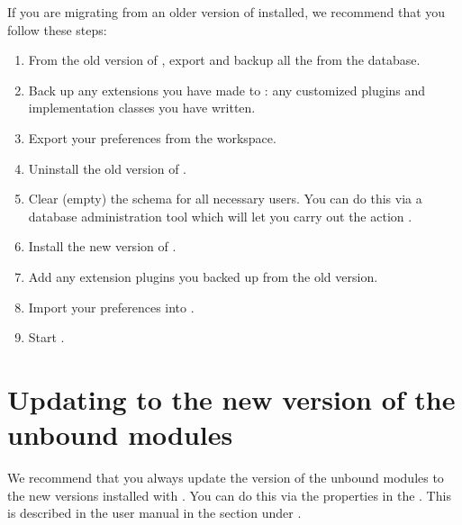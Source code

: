 If you are migrating from an older version of \app{} installed, we recommend that you follow these steps:

\begin{enumerate}
\item From the old version of \app{}, export and backup all the \gdprojects{} from the database. 
\item Back up any extensions you have made to \app{}: any customized plugins and implementation classes you have written.  
\item Export your \gddb{} preferences from the workspace.
\item Uninstall the old version of \app{}. 
\item Clear (empty) the \gddb{} schema for all necessary \app{} users. You can do this via a database administration tool which will let you carry out the action . 
\item Install the new version of \app{}.
\item Add any extension plugins you backed up from the old version.
\item Import your \gddb{} preferences into \app{}.
\item Start \app{}.  

\end{enumerate}

\section{Updating to the new version of the unbound modules}
We recommend that you always update the version of the unbound modules \gdprojects{} to the new versions installed with \app{}. You can do this via the \gdproject{} properties in the \ite{}. This is described in the user manual in the  section under \bxname{\gdprojects{}}. 


